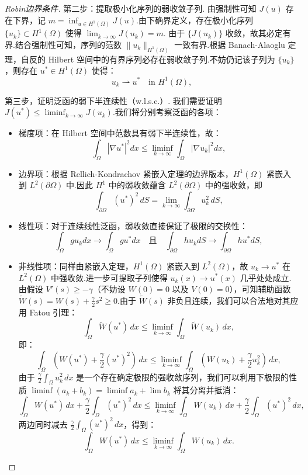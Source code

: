 \begin{proof}[Robin边界条件]
第二步：提取极小化序列的弱收敛子列.
由强制性可知 $J(u)$ 存在下界，记 $m = \inf_{u \in H^1(\Omega)} J(u)$.由下确界定义，存在极小化序列 $\{u_k\} \subset H^1(\Omega)$ 使得 $\lim_{k \to \infty} J(u_k) = m$.
由于 $\{J(u_k)\}$ 收敛，故其必定有界.结合强制性可知，序列的范数 $\|u_k\|_{H^1(\Omega)}$ 一致有界.根据 Banach-Alaoglu 定理，自反的 Hilbert 空间中的有界序列必存在弱收敛子列.不妨仍记该子列为 $\{u_k\}$，则存在 $u^* \in H^1(\Omega)$ 使得：
$$u_k \rightharpoonup u^* \quad \text{in } H^1(\Omega),$$

第三步，证明泛函的弱下半连续性（w.l.s.c.）.
我们需要证明 $J(u^*) \le \liminf_{k \to \infty} J(u_k)$.我们将分别考察泛函的各项：
\begin{itemize}
\item {\heiti 梯度项：}在 Hilbert 空间中范数具有弱下半连续性，故：
$$\int_{\Omega} |\nabla u^*|^2 dx \le \liminf_{k \to \infty} \int_{\Omega} |\nabla u_k|^2 dx,$$
\item {\heiti 边界项：}根据 Rellich-Kondrachov 紧嵌入定理的边界版本，$H^1(\Omega)$ 紧嵌入到 $L^2(\partial \Omega)$ 中.因此 $H^1$ 中的弱收敛蕴含 $L^2(\partial \Omega)$ 中的强收敛，即 
$$\int_{\partial \Omega} (u^*)^2 \, dS = \lim_{k \to \infty} \int_{\partial \Omega} u_k^2 \, dS,$$
\item {\heiti 线性项：}对于连续线性泛函，弱收敛直接保证了极限的交换性：
$$\int_{\Omega} gu_k dx \to \int_{\Omega} gu^* dx \quad \text{且} \quad \int_{\partial \Omega} hu_k dS \to \int_{\partial \Omega} hu^* dS,$$
\item {\heiti 非线性项：}同样由紧嵌入定理，$H^1(\Omega)$ 紧嵌入到 $L^2(\Omega)$，故 $u_k \to u^*$ 在 $L^2(\Omega)$ 中强收敛.进一步可提取子列使得 $u_k(x) \to u^*(x)$ 几乎处处成立.
由假设 $V'(s) \ge -\gamma$（不妨设 $W(0)=0$ 以及 $V(0)=0$），可知辅助函数 $\tilde{W}(s) = W(s) + \frac{\gamma}{2}s^2 \ge 0$.由于 $\tilde{W}(s)$ 非负且连续，我们可以合法地对其应用 Fatou 引理：
$$\int_{\Omega} \tilde{W}(u^*) \, dx \le \liminf_{k \to \infty} \int_{\Omega} \tilde{W}(u_k) \, dx,$$
即：
$$\int_{\Omega} \left( W(u^*) + \frac{\gamma}{2}(u^*)^2 \right) \, dx \le \liminf_{k \to \infty} \int_{\Omega} \left( W(u_k) + \frac{\gamma}{2}u_k^2 \right) \, dx,$$
由于 $\frac{\gamma}{2} \int_{\Omega} u_k^2 \, dx$ 是一个存在确定极限的强收敛序列，我们可以利用下极限的性质 $\liminf (a_k + b_k) = \liminf a_k + \lim b_k$ 将其分离并抵消：
$$\int_{\Omega} W(u^*) \, dx + \frac{\gamma}{2} \int_{\Omega} (u^*)^2 \, dx \le \liminf_{k \to \infty} \int_{\Omega} W(u_k) \, dx + \frac{\gamma}{2} \int_{\Omega} (u^*)^2 \, dx,$$
两边同时减去 $\frac{\gamma}{2} \int_{\Omega} (u^*)^2 \, dx$，得到：
$$\int_{\Omega} W(u^*) \, dx \le \liminf_{k \to \infty} \int_{\Omega} W(u_k) \, dx.$$
\end{itemize}


\end{proof}
